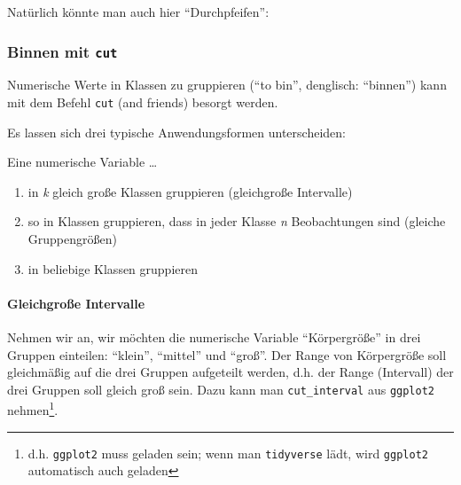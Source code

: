 \documentclass[12pt,ngerman,]{book}
\makeatletter
\newenvironment{Shaded}{\begin{snugshade}}{\end{snugshade}}
\newcommand{\KeywordTok}[1]{\textcolor[rgb]{0.13,0.29,0.53}{\textbf{#1}}}
\newcommand{\DataTypeTok}[1]{\textcolor[rgb]{0.13,0.29,0.53}{#1}}
\newcommand{\DecValTok}[1]{\textcolor[rgb]{0.00,0.00,0.81}{#1}}
\newcommand{\StringTok}[1]{\textcolor[rgb]{0.31,0.60,0.02}{#1}}
\newcommand{\CommentTok}[1]{\textcolor[rgb]{0.56,0.35,0.01}{\textit{#1}}}
\newcommand{\OperatorTok}[1]{\textcolor[rgb]{0.81,0.36,0.00}{\textbf{#1}}}
\newcommand{\NormalTok}[1]{#1}
\providecommand{\tightlist}{%
  \setlength{\itemsep}{0pt}\setlength{\parskip}{0pt}}
\let\oldparagraph\paragraph
\renewcommand{\paragraph}[1]{\oldparagraph{#1}\mbox{}}
\let\rmarkdownfootnote\footnote%
\def\footnote{\protect\rmarkdownfootnote}
\newenvironment{kframe}{%
\medskip{}
\setlength{\fboxsep}{.8em}
 \def\at@end@of@kframe{}%
 \ifinner\ifhmode%
  \def\at@end@of@kframe{\end{minipage}}%
  \begin{minipage}{\columnwidth}%
 \fi\fi%
 \def\FrameCommand##1{\hskip\@totalleftmargin \hskip-\fboxsep
 \colorbox{shadecolor}{##1}\hskip-\fboxsep
     \hskip-\linewidth \hskip-\@totalleftmargin \hskip\columnwidth}%
 \MakeFramed {\advance\hsize-\width
   \@totalleftmargin\z@ \linewidth\hsize
   \@setminipage}}%
 {\par\unskip\endMakeFramed%
 \at@end@of@kframe}
\renewenvironment{Shaded}{\begin{kframe}}{\end{kframe}}
\theoremstyle{definition}
\theoremstyle{definition}
\theoremstyle{remark}
\makeatother
\begin{document}
Natürlich könnte man auch hier ``Durchpfeifen'':

\begin{Shaded}
\end{Shaded}

\subsubsection{\texorpdfstring{Binnen mit
\texttt{cut}}{Binnen mit cut}}\label{binnen-mit-cut}

Numerische Werte in Klassen zu gruppieren (``to bin'', denglisch:
``binnen'') kann mit dem Befehl \texttt{cut} (and friends) besorgt
werden.

Es lassen sich drei typische Anwendungsformen unterscheiden:

Eine numerische Variable \ldots{}

\begin{enumerate}
\def\labelenumi{\arabic{enumi}.}
\tightlist
\item
  in \emph{k} gleich große Klassen gruppieren (gleichgroße Intervalle)
\item
  so in Klassen gruppieren, dass in jeder Klasse \emph{n} Beobachtungen
  sind (gleiche Gruppengrößen)
\item
  in beliebige Klassen gruppieren
\end{enumerate}

\paragraph{Gleichgroße Intervalle}\label{gleichgroe-intervalle}

Nehmen wir an, wir möchten die numerische Variable ``Körpergröße'' in
drei Gruppen einteilen: ``klein'', ``mittel'' und ``groß''. Der Range
von Körpergröße soll gleichmäßig auf die drei Gruppen aufgeteilt werden,
d.h. der Range (Intervall) der drei Gruppen soll gleich groß sein. Dazu
kann man \texttt{cut\_interval} aus \texttt{ggplot2} nehmen\footnote{d.h.
  \texttt{ggplot2} muss geladen sein; wenn man \texttt{tidyverse} lädt,
  wird \texttt{ggplot2} automatisch auch geladen}.
\end{document}

